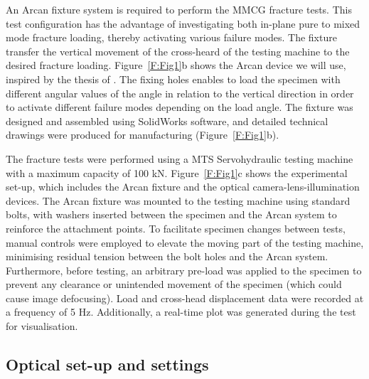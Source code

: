 \documentclass[3p,times,procedia]{elsarticle}
\begin{document}
An Arcan fixture system is required to perform the MMCG fracture tests. This test configuration has the advantage of investigating both in-plane pure to mixed mode fracture loading, thereby activating various failure modes. The fixture transfer the vertical movement of the cross-heard of the testing machine to the desired fracture loading. Figure~\ref{F:Fig1}b shows the Arcan device we will use, inspired by the thesis of \citep{Odounga2018phd}. The fixing holes enables to load the specimen with different angular values of the angle in relation to the vertical direction in order to activate different failure modes depending on the load angle.  The fixture was designed and assembled using SolidWorks software, and detailed technical drawings were produced for manufacturing (Figure~\ref{F:Fig1}b).

The fracture tests were performed using a MTS Servohydraulic testing machine with a maximum capacity of 100 kN. Figure~\ref{F:Fig1}c shows the experimental set-up, which includes the Arcan fixture and the optical camera-lens-illumination devices. The Arcan fixture was mounted to the testing machine using standard bolts, with washers inserted between the specimen and the Arcan system to reinforce the attachment points. To facilitate specimen changes between tests, manual controls were employed to elevate the moving part of the testing machine, minimising residual tension between the bolt holes and the Arcan system. Furthermore, before testing, an arbitrary pre-load was applied to the specimen to prevent any clearance or unintended movement of the specimen (which could cause image defocusing). Load and cross-head displacement data were recorded at a frequency of 5 Hz. Additionally, a real-time plot was generated during the test for visualisation.


\subsection{Optical set-up and settings}\label{Ss:optical}
\end{document}
